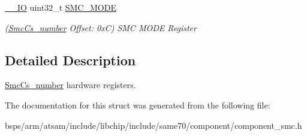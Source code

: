 \begin{DoxyCompactItemize}
\mbox{\label{structSmcCs__number_acfee80d4a6702b950e2950f8a3935170}} 
\mbox{\hyperlink{core__cm7_8h_aec43007d9998a0a0e01faede4133d6be}{\+\_\+\+\_\+\+IO}} uint32\+\_\+t \mbox{\hyperlink{structSmcCs__number_acfee80d4a6702b950e2950f8a3935170}{S\+M\+C\+\_\+\+M\+O\+DE}}
\begin{DoxyCompactList}\small\item\em (\mbox{\hyperlink{structSmcCs__number}{Smc\+Cs\+\_\+number}} Offset\+: 0xC) S\+MC M\+O\+DE Register \end{DoxyCompactList}\end{DoxyCompactItemize}


\subsection{Detailed Description}
\mbox{\hyperlink{structSmcCs__number}{Smc\+Cs\+\_\+number}} hardware registers. 

The documentation for this struct was generated from the following file\+:\begin{DoxyCompactItemize}
\item 
bsps/arm/atsam/include/libchip/include/same70/component/component\+\_\+smc.\+h\end{DoxyCompactItemize}
